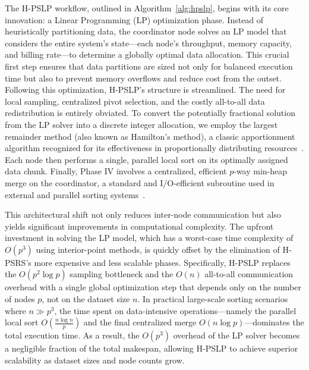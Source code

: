 \documentclass{article}
\begin{document}
The H-PSLP workflow, outlined in Algorithm~\ref{alg:hpslp}, begins with its core innovation: a Linear Programming (LP) optimization phase. Instead of heuristically partitioning data, the coordinator node solves an LP model that considers the entire system's state—each node's throughput, memory capacity, and billing rate—to determine a globally optimal data allocation. This crucial first step ensures that data partitions are sized not only for balanced execution time but also to prevent memory overflows and reduce cost from the outset. Following this optimization, H-PSLP's structure is streamlined. The need for local sampling, centralized pivot selection, and the costly all-to-all data redistribution is entirely obviated. To convert the potentially fractional solution from the LP solver into a discrete integer allocation, we employ the largest remainder method (also known as Hamilton's method), a classic apportionment algorithm recognized for its effectiveness in proportionally distributing resources~\cite{gptclaim11_12, gptclaim13}. Each node then performs a single, parallel local sort on its optimally assigned data chunk. Finally, Phase IV involves a centralized, efficient $p$-way min-heap merge on the coordinator, a standard and I/O-efficient subroutine used in external and parallel sorting systems~\cite{gptmerge1_2, gptmerge3_7, gptmerge4_5_8}.

This architectural shift not only reduces inter-node communication but also yields significant improvements in computational complexity. The upfront investment in solving the LP model, which has a worst-case time complexity of \( O(p^3) \) using interior-point methods, is quickly offset by the elimination of H-PSRS's more expensive and less scalable phases. Specifically, H-PSLP replaces the \( O(p^2 \log p) \) sampling bottleneck and the \( O(n) \) all-to-all communication overhead with a single global optimization step that depends only on the number of nodes \( p \), not on the dataset size \( n \). In practical large-scale sorting scenarios where \( n \gg p^3 \), the time spent on data-intensive operations—namely the parallel local sort \( O\left(\frac{n \log n}{p}\right) \) and the final centralized merge \( O(n \log p) \)—dominates the total execution time. As a result, the \( O(p^3) \) overhead of the LP solver becomes a negligible fraction of the total makespan, allowing H-PSLP to achieve superior scalability as dataset sizes and node counts grow.
\end{document}
